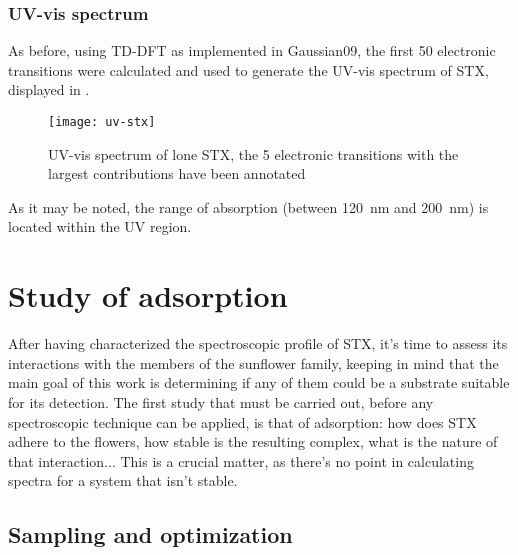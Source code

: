 \subsubsection{UV-vis spectrum}
As before, using TD-DFT as implemented in Gaussian09, the first 50 electronic transitions were calculated and used to generate the UV-vis spectrum of STX, displayed in .

\begin{figure}
    \texttt{[image: uv-stx]}
    \caption[UV-vis spectrum of lone STX]{UV-vis spectrum of lone STX, the 5 electronic transitions with the largest contributions have been annotated}
\end{figure}

As it may be noted, the range of absorption (between \SI{120}{\nano\metre} and \SI{200}{\nano\metre}) is located within the UV region.

\section{Study of adsorption}

After having characterized the spectroscopic profile of STX, it's time to assess its interactions with the members of the sunflower family, keeping in mind that the main goal of this work is determining if any of them could be a substrate suitable for its detection.
The first study that must be carried out, before any spectroscopic technique can be applied, is that of adsorption: how does STX adhere to the flowers, how stable is the resulting complex, what is the nature of that interaction...
This is a crucial matter, as there's no point in calculating spectra for a system that isn't stable.

\subsection{Sampling and optimization}

